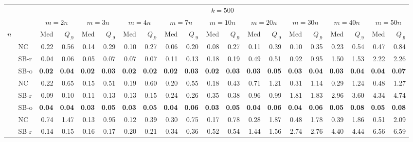\documentclass[runningheads,a4paper]{llncs}
\begin{document}
\begin{sidewaystable}
\scriptsize
\centering
\begin{tabularx}{1\textwidth}{p{0.8cm}p{0.8cm}|RR|RR|RR|RR|RR|RR|RR|RR|RR}
& &  \\
  & &  &  &  &  &  &  &  &  &  \\
\centering $n$ & & Med & $Q_{.9}$ & Med & $Q_{.9}$ & Med & $Q_{.9}$ & Med & $Q_{.9}$ & Med & $Q_{.9}$ & Med & $Q_{.9}$ & Med & $Q_{.9}$ & Med & $Q_{.9}$ & Med & $Q_{.9}$ \\
\hline
\centering{} & \centering NC & 0.22 & 0.56 & 0.14 & 0.29 & 0.10 & 0.27 & 0.06 & 0.20 & 0.08 & 0.27 & 0.11 & 0.39 & 0.10 & 0.35 & 0.23 & 0.54 & 0.47 & 0.84 \\
 & \centering SB-r  & 0.04 & 0.06 & 0.05 & 0.07 & 0.07 & 0.07 & 0.11 & 0.13 & 0.18 & 0.19 & 0.49 & 0.51 & 0.92 & 0.95 & 1.50 & 1.53 & 2.22 & 2.26 \\
 & \centering SB-o  & \textbf{0.02} & \textbf{0.04} & \textbf{0.02} & \textbf{0.03} & \textbf{0.02} & \textbf{0.02} & \textbf{0.02} & \textbf{0.03} & \textbf{0.02} & \textbf{0.03} & \textbf{0.03} & \textbf{0.05} & \textbf{0.03} & \textbf{0.04} & \textbf{0.03} & \textbf{0.04} & \textbf{0.04} & \textbf{0.07} \\
\hline
\centering{} & \centering NC & 0.22 & 0.65 & 0.15 & 0.51 & 0.19 & 0.60 & 0.20 & 0.55 & 0.18 & 0.43 & 0.71 & 1.21 & 0.31 & 1.14 & 0.29 & 1.24 & 0.48 & 1.27 \\
 & \centering SB-r  & 0.09 & 0.10 & 0.11 & 0.13 & 0.13 & 0.15 & 0.24 & 0.26 & 0.35 & 0.38 & 0.96 & 0.99 & 1.81 & 1.83 & 2.96 & 3.60 & 4.34 & 4.74 \\
 & \centering SB-o  & \textbf{0.04} & \textbf{0.04} & \textbf{0.03} & \textbf{0.05} & \textbf{0.03} & \textbf{0.05} & \textbf{0.04} & \textbf{0.06} & \textbf{0.03} & \textbf{0.05} & \textbf{0.04} & \textbf{0.06} & \textbf{0.04} & \textbf{0.06} & \textbf{0.05} & \textbf{0.08} & \textbf{0.05} & \textbf{0.08} \\
\hline
\centering{} & \centering NC & 0.74 & 1.47 & 0.13 & 0.95 & 0.12 & 0.39 & 0.30 & 0.75 & 0.17 & 0.78 & 0.28 & 1.87 & 0.48 & 1.78 & 0.39 & 1.86 & 0.51 & 2.09 \\
 & \centering SB-r  & 0.14 & 0.15 & 0.16 & 0.17 & 0.20 & 0.21 & 0.34 & 0.36 & 0.52 & 0.54 & 1.44 & 1.56 & 2.74 & 2.76 & 4.40 & 4.44 & 6.56 & 6.59 \\

\end{tabularx}
\end{sidewaystable}
\end{document}
